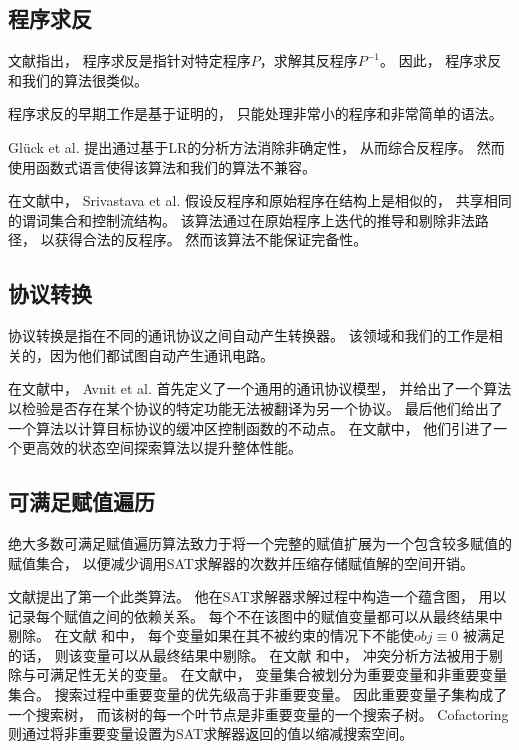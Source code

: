 \subsection{程序求反}\label{subsec_proinv}
文献指出，
程序求反是指针对特定程序$P$，求解其反程序$P^{-1}$。
因此，
程序求反和我们的算法很类似。

程序求反的早期工作是基于证明的，
只能处理非常小的程序和非常简单的语法。

Gl\"{u}ck et al.  提出通过基于LR的分析方法消除非确定性，
从而综合反程序。
然而使用函数式语言使得该算法和我们的算法不兼容。

在文献中，
Srivastava et al. 假设反程序和原始程序在结构上是相似的，
共享相同的谓词集合和控制流结构。
该算法通过在原始程序上迭代的推导和剔除非法路径，
以获得合法的反程序。
然而该算法不能保证完备性。



\subsection{协议转换}
协议转换是指在不同的通讯协议之间自动产生转换器。
该领域和我们的工作是相关的，因为他们都试图自动产生通讯电路。

在文献中，
Avnit et al. 首先定义了一个通用的通讯协议模型，
并给出了一个算法以检验是否存在某个协议的特定功能无法被翻译为另一个协议。
最后他们给出了一个算法以计算目标协议的缓冲区控制函数的不动点。
在文献中，
他们引进了一个更高效的状态空间探索算法以提升整体性能。

\subsection{可满足赋值遍历}\label{subsec_relallsat}

绝大多数可满足赋值遍历算法致力于将一个完整的赋值扩展为一个包含较多赋值的赋值集合，
以便减少调用SAT求解器的次数并压缩存储赋值解的空间开销。

文献提出了第一个此类算法。
他在SAT求解器求解过程中构造一个蕴含图，
用以记录每个赋值之间的依赖关系。
每个不在该图中的赋值变量都可以从最终结果中剔除。
在文献 和中，
每个变量如果在其不被约束的情况下不能使$obj\equiv 0$ 被满足的话，
则该变量可以从最终结果中剔除。
在文献 和中，
冲突分析方法被用于剔除与可满足性无关的变量。
在文献中，
变量集合被划分为重要变量和非重要变量集合。
搜索过程中重要变量的优先级高于非重要变量。
因此重要变量子集构成了一个搜索树，
而该树的每一个叶节点是非重要变量的一个搜索子树。
Cofactoring  则通过将非重要变量设置为SAT求解器返回的值以缩减搜索空间。

